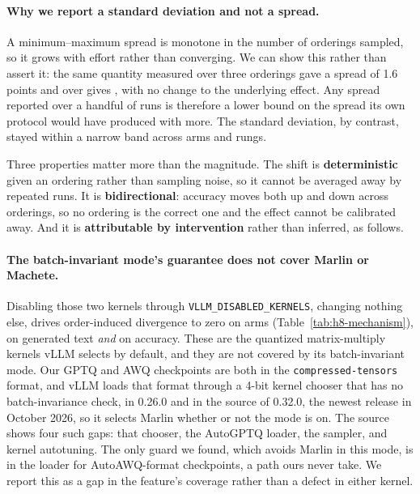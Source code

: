 \documentclass[conference]{IEEEtran}
\begin{document}
\begin{table}[t]
\centering
\caption{Accuracy across \hEightSDOrderings{} orderings of the same
\hEightItems{} items, in accuracy points, measured at the served batch size
$B=\hEightSDLevel$ (\S\ref{sec:determinism}). The standard deviation is the
inferential quantity; the range is descriptive only, being unstable and monotone in
the number of orderings sampled. \texttt{bf16} is identical under every ordering at
both rungs.}
\label{tab:h8-sd}
\small

\end{table}

\paragraph{Why we report a standard deviation and not a spread.}
A minimum--maximum spread is monotone in the number of orderings sampled, so it
grows with effort rather than converging. We can show this rather than assert it:
the same quantity measured over three orderings gave a spread of 1.6 points and
over \hEightSDOrderings{} gives \hEightRangeTen{}, with no change to the
underlying effect. Any spread reported over a handful of runs is therefore a lower
bound on the spread its own protocol would have produced with more. The standard
deviation, by contrast, stayed within a narrow band across arms and rungs.

Three properties matter more than the magnitude. The shift is
\textbf{deterministic} given an ordering rather than sampling noise, so it
cannot be averaged away by repeated runs. It is \textbf{bidirectional}:
accuracy moves both up and down across orderings, so no ordering is the correct
one and the effect cannot be calibrated away. And it is \textbf{attributable by
intervention} rather than inferred, as follows.

\paragraph{The batch-invariant mode's guarantee does not cover Marlin or Machete.}
Disabling those two kernels through \texttt{VLLM\_DISABLED\_KERNELS}, changing
nothing else, drives order-induced divergence to zero on \hEightPinned{} arms
(Table~\ref{tab:h8-mechanism}), on generated text \emph{and} on accuracy.
These are the quantized matrix-multiply kernels vLLM selects by default, and
they are not covered by its batch-invariant mode. Our GPTQ and AWQ checkpoints are both
in the \texttt{compressed-tensors} format, and vLLM loads that format through a 4-bit
kernel chooser that has no batch-invariance check, in 0.26.0 and in the source of 0.32.0,
the newest release in October 2026, so it selects Marlin whether or not the mode is on. The source shows
four such gaps: that chooser, the AutoGPTQ loader, the sampler, and kernel autotuning. The
only guard we found, which avoids Marlin in this mode, is in the loader for AutoAWQ-format
checkpoints, a path ours never take. We report this as a gap in the feature's coverage
rather than a defect in either kernel.
\end{document}
